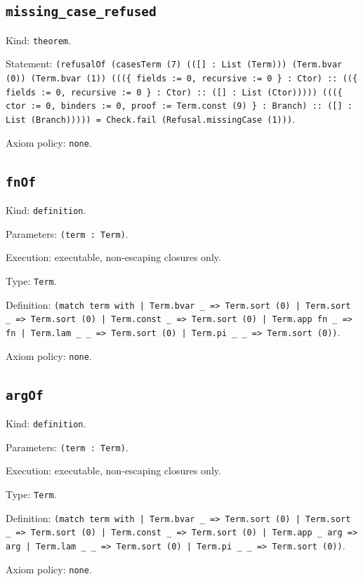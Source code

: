 \documentclass[11pt]{article}
\begin{document}
\subsection*{\texttt{missing\_case\_refused}}
\noindent Kind: \texttt{theorem}.\par
\noindent Statement: \texttt{(refusalOf (casesTerm (7) (([] : List (Term))) (Term.bvar (0)) (Term.bvar (1)) (((\{ fields := 0, recursive := 0 \} : Ctor) :: ((\{ fields := 0, recursive := 0 \} : Ctor) :: ([] : List (Ctor))))) (((\{ ctor := 0, binders := 0, proof := Term.const (9) \} : Branch) :: ([] : List (Branch))))) = Check.fail (Refusal.missingCase (1)))}.\par
\noindent Axiom policy: \texttt{none}.\par
\subsection*{\texttt{fnOf}}
\noindent Kind: \texttt{definition}.\par
\noindent Parameters: \texttt{(term : Term)}.\par
\noindent Execution: executable, non-escaping closures only.\par
\noindent Type: \texttt{Term}.\par
\noindent Definition: \texttt{(match term with | Term.bvar \_ => Term.sort (0) | Term.sort \_ => Term.sort (0) | Term.const \_ => Term.sort (0) | Term.app fn \_ => fn | Term.lam \_ \_ => Term.sort (0) | Term.pi \_ \_ => Term.sort (0))}.\par
\noindent Axiom policy: \texttt{none}.\par
\subsection*{\texttt{argOf}}
\noindent Kind: \texttt{definition}.\par
\noindent Parameters: \texttt{(term : Term)}.\par
\noindent Execution: executable, non-escaping closures only.\par
\noindent Type: \texttt{Term}.\par
\noindent Definition: \texttt{(match term with | Term.bvar \_ => Term.sort (0) | Term.sort \_ => Term.sort (0) | Term.const \_ => Term.sort (0) | Term.app \_ arg => arg | Term.lam \_ \_ => Term.sort (0) | Term.pi \_ \_ => Term.sort (0))}.\par
\noindent Axiom policy: \texttt{none}.\par
\end{document}
